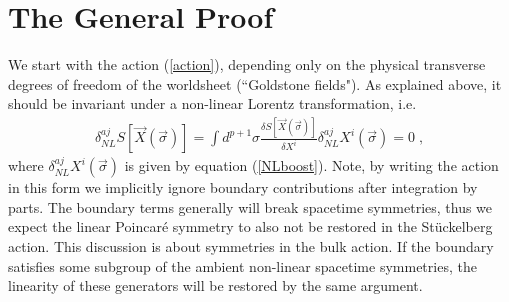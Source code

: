 \documentclass[%
 reprint,
 amsmath,amssymb,
 aps,
]{revtex4-1}
\begin{document}
\section{The General Proof}

We start with  the action (\ref{action}), depending
only on the physical transverse degrees of freedom of the worldsheet (``Goldstone fields").
As explained above, it should be invariant under a non-linear Lorentz transformation, i.e.
\begin{eqnarray}
    \delta^{a j}_{NL} S \left[ \vec{X}(\vec{\sigma}) \right]
    =
    \int d^{p+1} \sigma  \frac{\delta S[ \vec{X}(\vec{\sigma}) ]}{\delta X^i}
    \delta^{a j}_{NL} X^i(\vec{\sigma}) \nonumber = 0 \; , \nonumber
\end{eqnarray}
where $\delta^{aj}_{NL} X^i(\vec{\sigma})$ is given by equation (\ref{NLboost}).
Note, by writing the action in this form we implicitly ignore boundary contributions after integration by parts.
The boundary terms generally will break spacetime symmetries, thus we expect the linear Poincar\'e symmetry to also
not be restored in the St\"uckelberg action.  This discussion is about symmetries in the bulk action.  If the boundary
satisfies some subgroup of the ambient non-linear spacetime symmetries, the linearity of these generators will be restored by the
same argument.
\end{document}

